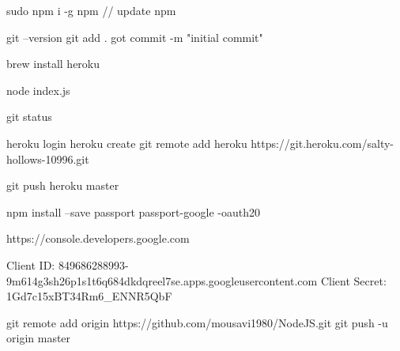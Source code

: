sudo npm i -g npm  // update npm


git --version
git add .
got commit -m "initial commit"

brew install heroku

node index.js

git status

heroku login
heroku create
git remote add heroku https://git.heroku.com/salty-hollows-10996.git


git push heroku master

npm install --save passport passport-google -oauth20

https://console.developers.google.com

Client ID: 849686288993-9m614g3sh26p1s1t6q684dkdqreel7se.apps.googleusercontent.com
Client Secret: 1Gd7c15xBT34Rm6_ENNR5QbF

git remote add origin https://github.com/mousavi1980/NodeJS.git
git push -u origin master